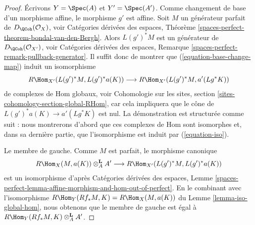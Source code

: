 \begin{proof}
Écrivons $Y = \Spec(A)$ et $Y' = \Spec(A')$. Comme changement de base d'un morphisme
affine, le morphisme $g'$ est affine. Soit $M$ un générateur parfait
de $D_\QCoh(\mathcal{O}_X)$, voir Catégories dérivées des espaces, Théorème
\ref{spaces-perfect-theorem-bondal-van-den-Bergh}. Alors $L(g')^*M$ est un
générateur de $D_\QCoh(\mathcal{O}_{X'})$, voir
Catégories dérivées des espaces, Remarque
\ref{spaces-perfect-remark-pullback-generator}.
Il suffit donc de montrer que (\ref{equation-base-change-map})
induit un isomorphisme
\begin{equation}
\label{equation-iso}
R\Hom_{X'}(L(g')^*M, L(g')^*a(K))
\longrightarrow
R\Hom_{X'}(L(g')^*M, a'(Lg^*K))
\end{equation}
de complexes de Hom globaux, voir
Cohomologie sur les sites, section \ref{sites-cohomology-section-global-RHom},
car cela impliquera que le cône de $L(g')^*a(K) \to a'(Lg^*K)$
est nul.
La démonstration est structurée comme suit : nous montrerons d'abord que
ces complexes de Hom sont isomorphes et, dans sa dernière partie,
que l'isomorphisme est induit par (\ref{equation-iso}).

\medskip\noindent
Le membre de gauche. Comme $M$ est parfait, le morphisme canonique
$$
R\Hom_X(M, a(K)) \otimes^\mathbf{L}_A A'
\longrightarrow
R\Hom_{X'}(L(g')^*M, L(g')^*a(K))
$$
est un isomorphisme d'après Catégories dérivées des espaces, Lemme
\ref{spaces-perfect-lemma-affine-morphism-and-hom-out-of-perfect}.
En le combinant avec l'isomorphisme
$R\Hom_Y(Rf_*M, K) = R\Hom_X(M, a(K))$
du Lemme \ref{lemma-iso-global-hom},
nous obtenons que le membre de gauche est égal à
$R\Hom_Y(Rf_*M, K) \otimes^\mathbf{L}_A A'$.


\end{proof}
